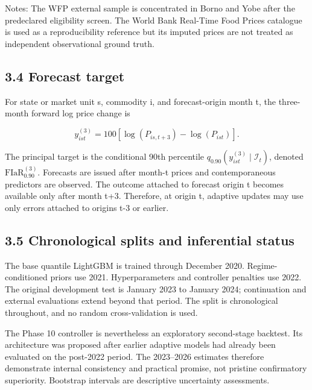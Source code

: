 Notes: The WFP external sample is concentrated in Borno and Yobe after
the predeclared eligibility screen. The World Bank Real-Time Food Prices
catalogue is used as a reproducibility reference but its imputed prices
are not treated as independent observational ground truth.

\subsection{3.4 Forecast target}\label{forecast-target}

For state or market unit s, commodity i, and forecast-origin month t,
the three-month forward log price change is

\[
y_{ist}^{(3)}=100\left[\log(P_{is,t+3})-\log(P_{ist})\right].
\]

The principal target is the conditional 90th percentile
\(q_{0.90}(y_{ist}^{(3)}\mid\mathcal{I}_t)\), denoted
\(\mathrm{FIaR}_{0.90}^{(3)}\). Forecasts are issued after month-t
prices and contemporaneous predictors are observed. The outcome attached
to forecast origin t becomes available only after month t+3. Therefore,
at origin t, adaptive updates may use only errors attached to origins
t-3 or earlier.

\subsection{3.5 Chronological splits and inferential
status}\label{chronological-splits-and-inferential-status}

The base quantile LightGBM is trained through December 2020.
Regime-conditioned priors use 2021. Hyperparameters and controller
penalties use 2022. The original development test is January 2023 to
January 2024; continuation and external evaluations extend beyond that
period. The split is chronological throughout, and no random
cross-validation is used.

The Phase 10 controller is nevertheless an exploratory second-stage
backtest. Its architecture was proposed after earlier adaptive models
had already been evaluated on the post-2022 period. The 2023--2026
estimates therefore demonstrate internal consistency and practical
promise, not pristine confirmatory superiority. Bootstrap intervals are
descriptive uncertainty assessments.
